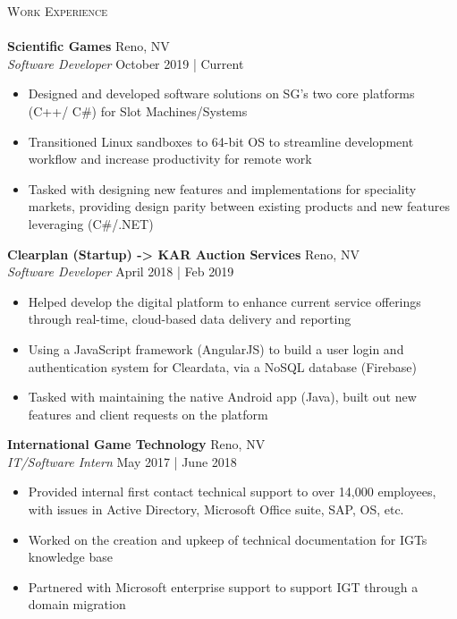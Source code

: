 \documentclass[a4paper]{article}
\newcommand{\lineunder} {
    \vspace*{-8pt} \\
    \hspace*{-18pt} \hrulefill \\
}
\newcommand{\header} [1] {
    {\hspace*{-18pt}\vspace*{6pt} \textsc{#1}}
    \vspace*{-6pt} \lineunder
}
\newcommand{\lineunder} {
    \vspace*{-8pt} \\
    \hspace*{-18pt} \hrulefill \\
}
\newcommand{\header} [1] {
    {\hspace*{-18pt}\vspace*{6pt} \textsc{#1}}
    \vspace*{-6pt} \lineunder
}
\begin{document}
\header{Work Experience}
\vspace{1mm}
\textbf{Scientific Games} \hfill Reno, NV\\
\textit{Software Developer } \hfill October 2019 | Current\\
\vspace{-1mm}
\begin{itemize} \itemsep 1pt
	\item Designed and developed software solutions on SG's two core platforms (C++/ C\#) for Slot Machines/Systems 
	\item Transitioned Linux sandboxes to 64-bit OS to streamline development workflow and increase productivity for remote work
	\item Tasked with designing new features and implementations for speciality markets, providing design parity between existing products and new features leveraging (C\#/.NET)
\end{itemize}
\textbf{Clearplan (Startup) -> KAR Auction Services} \hfill Reno, NV\\
\textit{Software Developer } \hfill April 2018 | Feb 2019\\
\vspace{-1mm}
\begin{itemize} \itemsep 1pt
	\item Helped develop the digital platform to enhance current service offerings through real-time, cloud-based data delivery and reporting   
	\item Using a JavaScript framework (AngularJS) to build a user login and authentication system for Cleardata, via a \textquotedbl{}NoSQL\textquotedbl{} database (Firebase)
	\item Tasked with maintaining the native Android app (Java), built out new features and client requests on the platform
\end{itemize}
\textbf{International Game Technology} \hfill Reno, NV\\
\textit{IT/Software Intern} \hfill May 2017 | June 2018\\
\vspace{-1mm}
\begin{itemize} \itemsep 1pt
	\item Provided internal first contact technical support to over 14,000 employees, with issues in Active Directory, Microsoft Office suite, SAP, OS, etc.
	\item Worked on the creation and upkeep of technical documentation for IGT\textquotesingle{}s knowledge base
	\item Partnered with Microsoft enterprise support to support IGT through a domain migration
\end{itemize}
\end{document}
